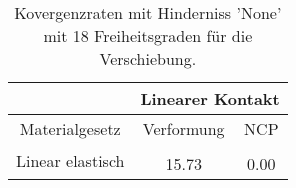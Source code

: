 \begin{table} 
\centering 
\begin{tabular}{c|cc|} 
\cline{2-3} 
 & \multicolumn{2}{|c|}{Linearer Kontakt} \\ 
\hline 
\multicolumn{1}{|c|}{Materialgesetz} & \multicolumn{1}{c|}{Verformung} & \multicolumn{1}{c|}{NCP} \\ 
\hline 
\multicolumn{1}{|c|}{\multirow{2}{*}{Linear elastisch}} &\multicolumn{1}{|c|}{} & \multicolumn{1}{|c|}{} \\ 
\multicolumn{1}{|c|}{} & \multicolumn{1}{|c|}{     15.73} & \multicolumn{1}{|c|}{      0.00} \\ 
\hline 
\end{tabular}\caption{Kovergenzraten mit Hinderniss 'None' mit 18 Freiheitsgraden für die Verschiebung.}\label{tab:Rate_None_level0}
\end{table} 
